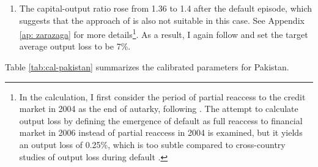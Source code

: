 \begin{enumerate}[label = (\roman*)]
{    }
    \item
    The capital-output ratio rose from 1.36 to 1.4 after the default episode, which suggests that the approach of \citet{zarazaga-12} is also not suitable in this case. See Appendix \ref{ap: zarazaga} for more details\footnote{
        In the calculation, I first consider the period of partial reaccess to the credit market in 2004 as the end of autarky, following \citet{trebesch-2011-sovereign}. The attempt to calculate output loss by defining the emergence of default as full reaccess to financial market in 2006 instead of partial reaccess in 2004 is examined, but it yields an output loss of 0.25\%, which is too subtle compared to cross-country studies of output loss during default \citep{Borensztein-Panizza-defualt-cost}.}.
    As a result, I again follow \citet{Na-18} and set the target average output loss to be 7\%.

\end{enumerate}
Table \ref{tab:cal-pakistan} summarizes the calibrated parameters for Pakistan.
